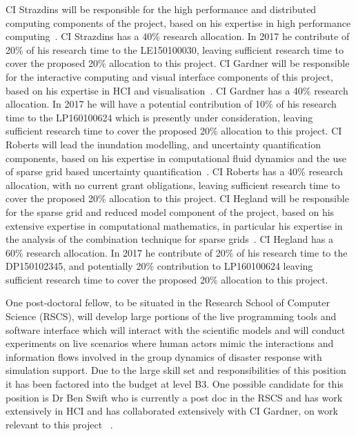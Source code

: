 CI Strazdins will be
responsible for the high performance and distributed computing
components of the project, based on his expertise in high performance
computing~\parencite{AliEtal2015,StrazdinsEtal2015,Ali11022016}.  
CI Strazdins has a 40\% research allocation. In 2017 he contribute of 20\% of his research time to the LE150100030, leaving sufficient research time to cover the proposed 20\% allocation to this project. 
%
CI Gardner will be responsible for the interactive computing and visual interface components of this project, based on
his expertise in HCI and visualisation~\parencite{martin2016intelligent,martin2015tracking,swift2014coding,swift2013visual,sorensen2010programming,swiftLive2016}.  CI Gardner has a 40\% research allocation. In 2017 he will have a potential contribution of 10\% of his research time to the LP160100624 which is presently under consideration, leaving sufficient research time to cover the proposed 20\% allocation to this project. 
%
CI Roberts will lead the inundation modelling, and
uncertainty quantification components, based on his expertise in
computational fluid dynamics and the use of sparse grid based
uncertainty quantification~\parencite{deBaarRDM2015,JakemanRoberts2013,anugamanual,nielsen2005hydrodynamic}.  
CI Roberts has a 40\% research allocation, with no current grant obligations,  leaving sufficient research time to cover the proposed 20\% allocation to this project. 
%
CI Hegland will be responsible for the
sparse grid and reduced model component of the project, based on his
extensive expertise in computational mathematics, in particular his
expertise in the analysis of the combination technique for sparse
grids~\parencite{AliEtal2015,HardingHLS2015,Ali11022016}. 
CI Hegland has a 60\% research allocation. In 2017 he contribute of 20\% of his research time to the DP150102345, and potentially 20\% contribution to LP160100624 leaving sufficient research time to cover the proposed 20\% allocation to this project. 


One post-doctoral fellow, to be situated in the
Research School of Computer Science (RSCS), will develop large
portions of the live programming tools and software interface which
will interact with the scientific models and will conduct experiments
on live scenarios where human actors mimic the interactions and
information flows involved in the group dynamics of disaster response
with simulation support. Due to the large skill set and responsibilities of 
this position it has been factored into the budget at level B3.
One possible candidate for this position is 
Dr Ben Swift who is currently a post doc in the RSCS and has work 
extensively in HCI and has collaborated extensively with CI Gardner, on work 
relevant to this project ~\parencite{martin2015tracking,martin2016intelligent,swiftLive2016,
swift2013visual,swift2014coding}.

